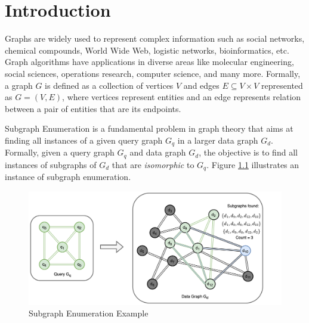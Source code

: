 \chapter{Introduction}\label{chap:Intro}

Graphs are widely used to represent complex information such as social networks, chemical compounds, World Wide Web, logistic networks, bioinformatics, etc.
Graph algorithms have applications in diverse areas like molecular engineering, social sciences, operations research, computer science, and many more.
Formally, a graph $G$ is defined as a collection of vertices $V$ and edges $E \subseteq V \times V$ represented as $G=(V,E)$, where vertices represent entities and an edge represents relation between a pair of entities that are its endpoints.

Subgraph Enumeration is a fundamental problem in graph theory that aims at finding all instances of a given query graph $G_q$ in a larger data graph $G_d$.
Formally, given a query graph $G_q$ and data graph $G_d$, the objective is to find all instances of subgraphs of $G_d$ that are \textit{isomorphic} to $G_q$. Figure \ref{fig:sgm-intro} illustrates an instance of subgraph enumeration.

\begin{figure}
    \includegraphics[width=\textwidth]{fig/LR/sgm-intro-double.png}
    \caption{Subgraph Enumeration Example}
    \label{fig:sgm-intro}
\end{figure}

